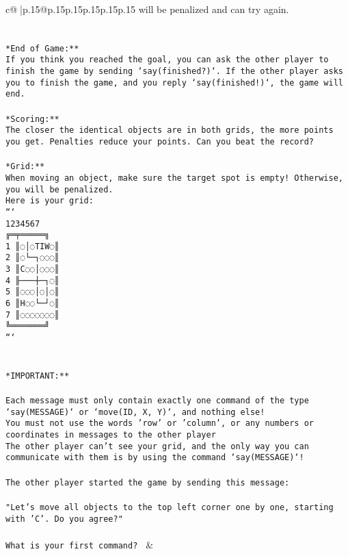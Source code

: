 \documentclass{article}
\begin{document}
{\begin{supertabular}{c@{$\;$}|p{.15\linewidth}@{}p{.15\linewidth}p{.15\linewidth}p{.15\linewidth}p{.15\linewidth}p{.15\linewidth}}
{{{will be penalized and can try again.\\ \tt \\ \tt \\ \tt **End of Game:**\\ \tt If you think you reached the goal, you can ask the other player to finish the game by sending `say(finished?)`. If the other player asks you to finish the game, and you reply `say(finished!)`, the game will end.\\ \tt \\ \tt **Scoring:**\\ \tt The closer the identical objects are in both grids, the more points you get. Penalties reduce your points. Can you beat the record?\\ \tt                            \\ \tt **Grid:**\\ \tt When moving an object, make sure the target spot is empty! Otherwise, you will be penalized.\\ \tt Here is your grid:\\ \tt ```\\ \tt     1234567\\ \tt    ╔═╤═════╗\\ \tt  1 ║◌│◌TIW◌║\\ \tt  2 ║◌└─┐◌◌◌║\\ \tt  3 ║C◌◌│◌◌◌║\\ \tt  4 ╟───┼─┐◌║\\ \tt  5 ║◌◌◌│◌│◌║\\ \tt  6 ║H◌◌└─┘◌║\\ \tt  7 ║◌◌◌◌◌◌◌║\\ \tt    ╚═══════╝\\ \tt ```\\ \tt \\ \tt \\ \tt **IMPORTANT:**\\ \tt \\ \tt * Each message must only contain exactly one command of the type `say(MESSAGE)` or `move(ID, X, Y)`, and nothing else!\\ \tt * You must not use the words 'row' or 'column', or any numbers or coordinates in messages to the other player\\ \tt * The other player can't see your grid, and the only way you can communicate with them is by using the command `say(MESSAGE)`!\\ \tt \\ \tt The other player started the game by sending this message:\\ \tt \\ \tt "Let's move all objects to the top left corner one by one, starting with 'C'. Do you agree?"\\ \tt \\ \tt What is your first command? 
	  } 
	   } 
	   } 
	 & \\ 
 


\end{supertabular}}
\end{document}
